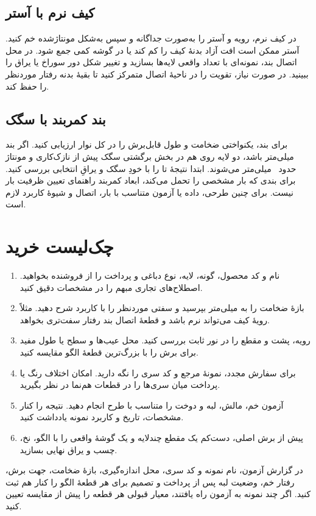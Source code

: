 \subsection{کیف نرم با آستر}

در کیف نرم، رویه و آستر را به‌صورت جداگانه و سپس به‌شکل مونتاژشده خم کنید. آستر ممکن است افت آزاد بدنۀ کیف را کم کند یا در گوشه کمی جمع شود. در محل اتصال بند، نمونه‌ای با تعداد واقعی لایه‌ها بسازید و تغییر شکل دور سوراخ یا یراق را ببینید. در صورت نیاز، تقویت را در ناحیۀ اتصال متمرکز کنید تا بقیۀ بدنه رفتار موردنظر را حفظ کند.

\subsection{بند کمربند با سگک}

برای بند، یکنواختی ضخامت و طول قابل‌برش را در کل نوار ارزیابی کنید. اگر بند ~میلی‌متر باشد، دو لایه روی هم در بخش برگشتی سگک پیش از نازک‌کاری و مونتاژ حدود ~میلی‌متر می‌شوند. ابتدا نتیجۀ تا را با خودِ سگک و یراقِ انتخابی بررسی کنید. برای بندی که بار مشخصی را تحمل می‌کند، ابعاد کمربند راهنمای تعیین ظرفیت بار نیست. برای چنین طرحی، داده یا آزمون متناسب با بار، اتصال و شیوۀ کاربرد لازم است.

\section{چک‌لیست خرید}

\begin{enumerate}
  \item نام و کد محصول، گونه، لایه، نوع دباغی و پرداخت را از فروشنده بخواهید. اصطلاح‌های تجاری مبهم را در مشخصات دقیق کنید.
  \item بازۀ ضخامت را به میلی‌متر بپرسید و سفتی موردنظر را با کاربرد شرح دهید. مثلاً رویۀ کیف می‌تواند نرم باشد و قطعۀ اتصال بند رفتار سفت‌تری بخواهد.
  \item رویه، پشت و مقطع را در نور ثابت بررسی کنید. محل عیب‌ها و سطح یا طول مفید برای برش را با بزرگ‌ترین قطعۀ الگو مقایسه کنید.
  \item برای سفارش مجدد، نمونۀ مرجع و کد سری را نگه دارید. امکان اختلاف رنگ یا پرداخت میان سری‌ها را در قطعات هم‌نما در نظر بگیرید.
  \item آزمون خم، مالش، لبه و دوخت را متناسب با طرح انجام دهید. نتیجه را کنار مشخصات، تاریخ و کاربرد نمونه یادداشت کنید.
  \item پیش از برش اصلی، دست‌کم یک مقطع چندلایه و یک گوشۀ واقعی را با الگو، نخ، چسب و یراق نهایی بسازید.
\end{enumerate}

در گزارش آزمون، نام نمونه و کد سری، محل اندازه‌گیری، بازۀ ضخامت، جهت برش، رفتار خم، وضعیت لبه پس از پرداخت و تصمیم برای هر قطعۀ الگو را کنار هم ثبت کنید. اگر چند نمونه به آزمون راه یافتند، معیار قبولی هر قطعه را پیش از مقایسه تعیین کنید.
